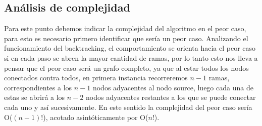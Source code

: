 \newpage
\subsection{An\'alisis de complejidad}

Para este punto debemos indicar la complejidad del algoritmo en el peor caso, para esto es necesario primero identificar que ser\'ia un peor caso.
Analizando el funcionamiento del backtracking, el comportamiento se orienta hacia el peor caso si en cada paso se abren la mayor cantidad de ramas, por lo tanto esto nos lleva a pensar que el peor caso ser\'a un grafo completo, ya que al estar todos los nodos conectados contra todos, en primera instancia recorreremos $n-1$ ramas, correspondientes a los $n-1$ nodos adyacentes al nodo source, luego cada una de estas se abrir\'a a los $n-2$ nodos adyacentes restantes a los que se puede conectar cada uno y as\'i sucesivamente. En este sentido la complejidad del peor caso ser\'ia O($(n-1)!$), acotado asint\'oticamente por O($n!$).





